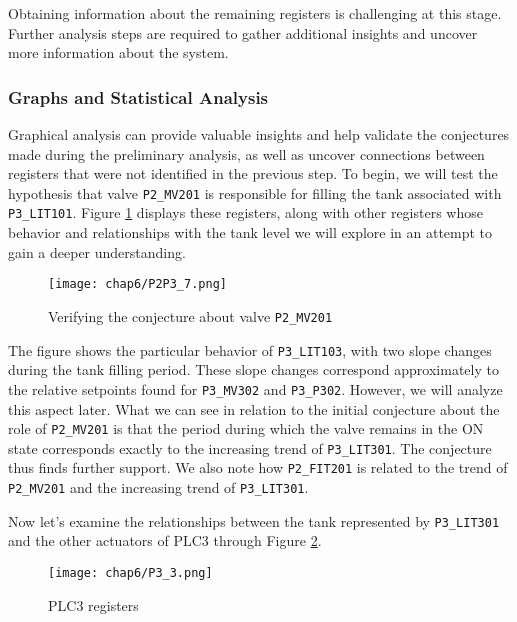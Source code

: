 \bigskip
Obtaining information about the remaining registers is challenging at this stage. Further analysis steps are required to gather additional insights and uncover more information about the system.

\subsubsection{Graphs and Statistical Analysis}
\label{subsubsec:6_P2P3_graphs}
Graphical analysis can provide valuable insights and help validate the conjectures made during the preliminary analysis, as well as uncover connections between registers that were not identified in the previous step. To begin, we will test the hypothesis that valve \texttt{P2\_MV201} is responsible for filling the tank associated with \texttt{P3\_LIT101}. Figure \ref{fig:6_graphs_P2P3_mv201} displays these registers, along with other registers whose behavior and relationships with the tank level we will explore in an attempt to gain a deeper understanding.

\begin{figure}[ht]
	\centering
	\texttt{[image: chap6/P2P3\_7.png]}
	\caption{Verifying the conjecture about valve \texttt{P2\_MV201} }
	\label{fig:6_graphs_P2P3_mv201}
\end{figure}

\bigskip
The figure shows the particular behavior of \texttt{P3\_LIT103}, with two slope changes during the tank filling period. These slope changes correspond approximately to the relative setpoints found for \texttt{P3\_MV302} and \texttt{P3\_P302}. However, we will analyze this aspect later.
What we can see in relation to the initial conjecture about the role of \texttt{P2\_MV201} is that the period during which the valve remains in the ON state corresponds exactly to the increasing trend of \texttt{P3\_LIT301}. The conjecture thus finds further support. We also note how \texttt{P2\_FIT201} is related to the trend of \texttt{P2\_MV201} and the increasing trend of \texttt{P3\_LIT301}. 

\bigskip
Now let's examine the relationships between the tank represented by \texttt{P3\_LIT301} and the other actuators of PLC3 through Figure \ref{fig:6_graphs_P3}.

\begin{figure}[ht]
	\centering
	\texttt{[image: chap6/P3\_3.png]}
	\caption{PLC3 registers}
	\label{fig:6_graphs_P3}
\end{figure}

